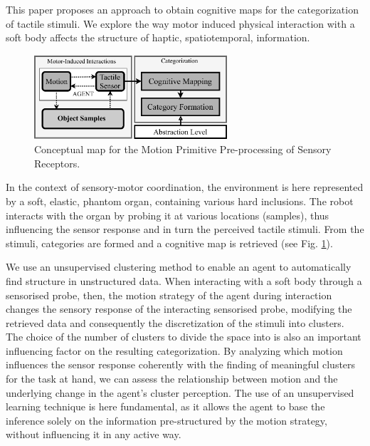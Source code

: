\documentclass[]{interact}
\theoremstyle{plain}%
\theoremstyle{definition}
\theoremstyle{remark}
\begin{document}
This paper proposes an approach to obtain cognitive maps for the categorization of tactile stimuli. 
We explore the way motor induced physical interaction with a soft body affects the structure of haptic, spatiotemporal, information. 


\begin{figure}[]
	\centering
	\includegraphics[width=0.64\textwidth]{./figs/conceptual_framework}
	\caption{Conceptual map for the Motion Primitive Pre-processing of Sensory Receptors.}
	\label{conceptual_map}
\end{figure}

In the context of sensory-motor coordination, the environment is here represented by a soft, elastic, phantom organ, containing various hard inclusions. The robot interacts with the organ by probing it at various locations (samples), thus influencing the sensor response and in turn the perceived tactile stimuli. From the stimuli, categories are formed and a cognitive map is retrieved (see Fig. \ref{conceptual_map}).

We use an unsupervised clustering method to enable an agent to automatically find structure in unstructured data. When interacting with a soft body through a sensorised probe, then, the motion strategy of the agent during interaction changes the sensory response of the interacting sensorised probe, modifying the retrieved data and consequently the discretization of the stimuli into clusters. The choice of the number of clusters to divide the space into is also an important influencing factor on the resulting categorization. By analyzing which motion influences the sensor response coherently with the finding of meaningful clusters for the task at hand, we can assess the relationship between motion and the underlying change in the agent's cluster perception. The use of an unsupervised learning technique is here fundamental, as it allows the agent to base the inference solely on the information pre-structured by the motion strategy, without influencing it in any active way.
\end{document}
